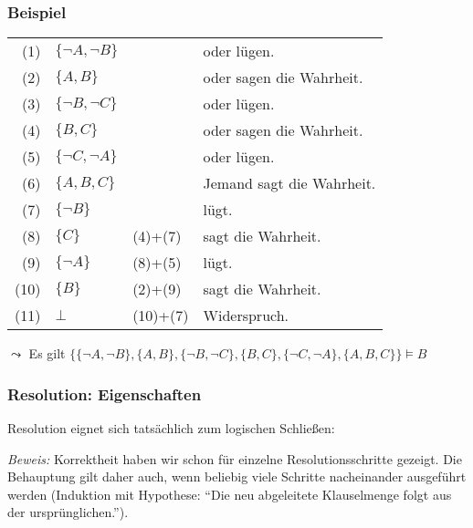 \documentclass[onlymath]{beamer}
\begin{document}
\begin{frame}\frametitle{Beispiel}

\begin{tabular}{rlll}
(1) & $\{\neg A, \neg B\}$ && \textcolor{devilscss}{\Aname{} oder \Bname{} lügen.}\\
(2) & $\{A, B\}$  && \textcolor{devilscss}{\Aname{} oder \Bname{} sagen die Wahrheit.} \\
(3) & $\{\neg B, \neg C\}$  && \textcolor{devilscss}{\Bname{} oder \Cname{} lügen.} \\
(4) & $\{B, C\}$ && \textcolor{devilscss}{\Bname{} oder \Cname{} sagen die Wahrheit.} \\
(5) & $\{\neg C, \neg A\}$ && \textcolor{devilscss}{\Cname{} oder \Aname{} lügen.} \\
(6) & $\{A, B, C\}$ && \textcolor{devilscss}{Jemand sagt die Wahrheit.}  \\
(7) & $\{\neg B\}$ && \textcolor{devilscss}{\Bname{} lügt.} \\\pause
(8) & $\{C\}$   &  (4)+(7) & \textcolor{devilscss}{\Cname{} sagt die Wahrheit.} \\\pause
(9) & $\{\neg A\}$ & (8)+(5) & \textcolor{devilscss}{\Aname{} lügt.}\\\pause
(10) & $\{B\}$  & (2)+(9) & \textcolor{devilscss}{\Bname{} sagt die Wahrheit.} \\\pause
(11) & $\bot$ & (10)+(7) & \textcolor{devilscss}{Widerspruch.} 
\end{tabular}\bigskip

$\leadsto$ Es gilt $\{\{\neg A, \neg B\},\{A, B\},\{\neg B, \neg C\},\{B, C\},\{\neg C, \neg A\},\{A, B, C\}\}\models B$

\end{frame}

\begin{frame}[t]\frametitle{Resolution: Eigenschaften}

Resolution eignet sich tatsächlich zum logischen Schließen:\medskip

\pause

\emph{Beweis:} \alert{Korrektheit} haben wir schon für einzelne Resolutionsschritte gezeigt.
Die Behauptung gilt daher auch, wenn beliebig viele Schritte nacheinander ausgeführt werden (Induktion
mit Hypothese: "`Die neu abgeleitete Klauselmenge folgt aus der ursprünglichen."').

\end{frame}
\end{document}
